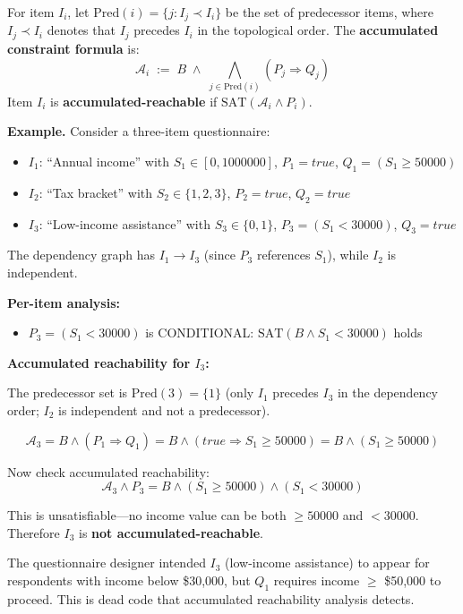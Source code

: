 \begin{definition}
\label{def:accumulated-reachability}
For item $I_i$, let $\mathrm{Pred}(i) = \{j : I_j \prec I_i\}$ be the set of predecessor items, where $I_j \prec I_i$ denotes that $I_j$ precedes $I_i$ in the topological order. The \textbf{accumulated constraint formula} is:
\[
  \mathcal{A}_i \;:=\; B \;\wedge\; \bigwedge_{j \in \mathrm{Pred}(i)} (P_j \Rightarrow Q_j)
\]
Item $I_i$ is \textbf{accumulated-reachable} if $\mathrm{SAT}(\mathcal{A}_i \wedge P_i)$.
\end{definition}

\begin{mdframed}
\noindent\textbf{Example.} Consider a three-item questionnaire:
\begin{itemize}
    \item $I_1$: ``Annual income'' with $S_1 \in [0, 1000000]$, $P_1 = \mathit{true}$, $Q_1 = (S_1 \geq 50000)$
    \item $I_2$: ``Tax bracket'' with $S_2 \in \{1, 2, 3\}$, $P_2 = \mathit{true}$, $Q_2 = \mathit{true}$
    \item $I_3$: ``Low-income assistance'' with $S_3 \in \{0, 1\}$, $P_3 = (S_1 < 30000)$, $Q_3 = \mathit{true}$
\end{itemize}

The dependency graph has $I_1 \to I_3$ (since $P_3$ references $S_1$), while $I_2$ is independent.

\textbf{Per-item analysis:}
\begin{itemize}
    \item $P_3 = (S_1 < 30000)$ is CONDITIONAL: $\mathrm{SAT}(B \wedge S_1 < 30000)$ holds
\end{itemize}

\textbf{Accumulated reachability for $I_3$:}

The predecessor set is $\mathrm{Pred}(3) = \{1\}$ (only $I_1$ precedes $I_3$ in the dependency order; $I_2$ is independent and not a predecessor).

\[
\mathcal{A}_3 = B \wedge (P_1 \Rightarrow Q_1) = B \wedge (\mathit{true} \Rightarrow S_1 \geq 50000) = B \wedge (S_1 \geq 50000)
\]

Now check accumulated reachability:
\[
\mathcal{A}_3 \wedge P_3 = B \wedge (S_1 \geq 50000) \wedge (S_1 < 30000)
\]

This is unsatisfiable—no income value can be both $\geq 50000$ and $< 30000$. Therefore $I_3$ is \textbf{not accumulated-reachable}.

The questionnaire designer intended $I_3$ (low-income assistance) to appear for respondents with income below \$30,000, but $Q_1$ requires income $\geq$ \$50,000 to proceed. This is dead code that accumulated reachability analysis detects.
\end{mdframed}

